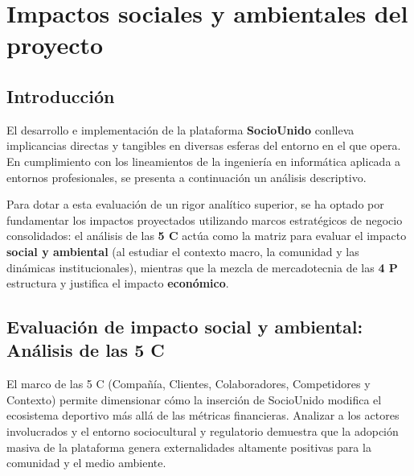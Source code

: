 \section{Impactos sociales y ambientales del proyecto}

\subsection{Introducción}

El desarrollo e implementación de la plataforma \textbf{SocioUnido} conlleva implicancias directas y tangibles en diversas esferas del entorno en el que opera. En cumplimiento con los lineamientos de la ingeniería en informática aplicada a entornos profesionales, se presenta a continuación un análisis descriptivo. 

Para dotar a esta evaluación de un rigor analítico superior, se ha optado por fundamentar los impactos proyectados utilizando marcos estratégicos de negocio consolidados: el análisis de las \textbf{5 C} actúa como la matriz para evaluar el impacto \textbf{social y ambiental} (al estudiar el contexto macro, la comunidad y las dinámicas institucionales), mientras que la mezcla de mercadotecnia de las \textbf{4 P} estructura y justifica el impacto \textbf{económico}.

\subsection{Evaluación de impacto social y ambiental: Análisis de las 5 C}

El marco de las 5 C (Compañía, Clientes, Colaboradores, Competidores y Contexto) permite dimensionar cómo la inserción de SocioUnido modifica el ecosistema deportivo más allá de las métricas financieras. Analizar a los actores involucrados y el entorno sociocultural y regulatorio demuestra que la adopción masiva de la plataforma genera externalidades altamente positivas para la comunidad y el medio ambiente.

